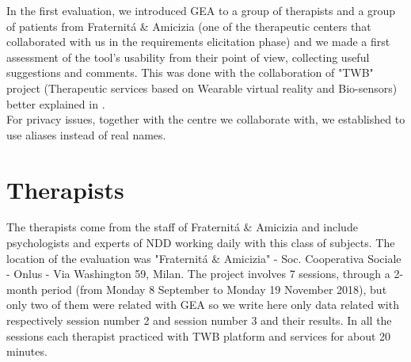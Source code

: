In the first evaluation, we introduced GEA to a group of therapists and a group of patients from Fraternit\'a \& Amicizia (one of the therapeutic centers that collaborated with us in the requirements elicitation phase) and we made a first assessment of the tool's usability from their point of view, collecting useful suggestions and comments. This was done with the collaboration of "TWB" project (Therapeutic services based on Wearable virtual reality and Bio-sensors) better explained in \cite{TWB}.\\
For privacy issues, together with the centre we collaborate with, we established to use aliases instead of real names.
\section{Therapists}
The therapists come from the staff of Fraternit\'a \& Amicizia and include psychologists and experts of NDD working daily with this class of subjects. The location of the evaluation was "Fraternit\'a \& Amicizia" - Soc. Cooperativa Sociale - Onlus - Via Washington 59, Milan. The project involves 7 sessions, through a 2-month period (from Monday 8 September to Monday 19 November 2018), but only two of them were related with GEA so we write here only data related with respectively session number 2 and session number 3 and their results. In all the sessions each therapist practiced with TWB platform and services for about 20 minutes.\\
